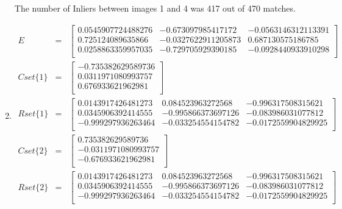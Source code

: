 \documentclass[10pt,letterpaper]{article}
\begin{document}
\begin{enumerate}[]
The number of Inliers between images 1 and 4 was 417 out of 470 matches. \\

\item 
\begin{eqnarray*}
E &=&
\begin{bmatrix}
        0.0545907724488276    &    -0.673097985417172      &  -0.0563146312113391 \\
        0.725124089635866      &    -0.0327622911205873    &   0.687130575186785 \\
        0.0258863359957035    &    -0.729705929390185      & -0.0928440933910298 \\
\end{bmatrix} \\
Cset\{1\} &=&
\begin{bmatrix}
        -0.735382629589736 \\
        0.0311971080993757 \\
         0.676933621962981 \\
\end{bmatrix} \\
Rset\{1\} &=&
\begin{bmatrix}
        0.0143917426481273      &   0.084523963272568    &    -0.996317508315621 \\
        0.0345906392414555      &  -0.995866373697126    &    -0.083986031077812 \\
        -0.999297936263464       & -0.033254554154782     &  -0.0172559904829925 \\
\end{bmatrix} \\
Cset\{2\} &=&
\begin{bmatrix}
         0.735382629589736 \\
       -0.0311971080993757 \\
        -0.676933621962981 \\
\end{bmatrix} \\
Rset\{2\} &=&
\begin{bmatrix}
        0.0143917426481273     &    0.084523963272568    &    -0.996317508315621 \\
        0.0345906392414555      &  -0.995866373697126   &     -0.083986031077812 \\
        -0.999297936263464      &  -0.033254554154782    &   -0.0172559904829925 \\
\end{bmatrix} \\

\end{eqnarray*}
\end{enumerate}
\end{document}
